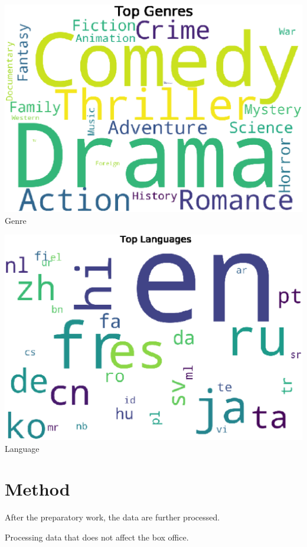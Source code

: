 \begin{center}
  \begin{minipage}{0.4\linewidth}
  \centering
    \includegraphics[width=0.8\linewidth]{figures//genre_clold.eps}\\
  {\small{Genre}}
  \end{minipage}
  \hfill
  \begin{minipage}{0.4\linewidth}
  \centering
    \includegraphics[width=0.8\linewidth]{figures//language.eps}\\
  {\small{Language}}
  \end{minipage}
  \hfill
\end{center}

\section{Method} \label{sec-method}
After the preparatory work, the data are further processed.

Processing data that does not affect the box office.

